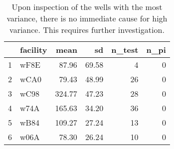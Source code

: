 \begin{table}[h]
\centering
\begin{tabular}{rlrrrr}
  \hline
 & facility & mean & sd & n\_test & n\_pi \\ 
  \hline
1 & wF8E & 87.96 & 69.58 &   4 &   0 \\ 
  2 & wCA0 & 79.43 & 48.99 &  26 &   0 \\ 
  3 & wC98 & 324.77 & 47.23 &  28 &   0 \\ 
  4 & w74A & 165.63 & 34.20 &  36 &   0 \\ 
  5 & wB84 & 109.27 & 27.24 &  13 &   0 \\ 
  6 & w06A & 78.30 & 26.24 &  10 &   0 \\ 
   \hline
\end{tabular}
\caption{Upon inspection of the wells with the most variance, there is no immediate cause for high variance. This requires further investigation.} 
\label{tab:well_summaries}
\end{table}
